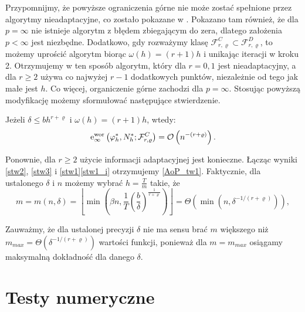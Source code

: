 \documentclass[oik, pdftex, robocza, man]{mgrwms}
\begin{document}
    Przypomnijmy, że powyższe ograniczenia górne nie może zostać spełnione przez algorytmy nieadaptacyjne, co zostało pokazane w \cite{PoA}. Pokazano tam również, że dla $p=\infty$ nie istnieje algorytm z błędem zbiegającym do zera, dlatego założenia $p < \infty$ jest niezbędne. Dodatkowo, gdy rozważymy klasę $\mathcal{F}_{r, \varrho}^{C} \subset \mathcal{F}_{r, \varrho}^{D}$, to możemy uprościć algorytm biorąc $\omega(h) = (r+1)h$ i unikając iteracji w kroku 2. Otrzymujemy w ten sposób algorytm, który dla $r=0,1$ jest nieadaptacyjny, a dla $r \geq 2$ używa co najwyżej $r-1$ dodatkowych punktów, niezależnie od tego jak małe jest $h$. Co więcej, organiczenie górne zachodzi dla $p = \infty$.
    Stosując powyższą modyfikację możemy sformułować następujące stwierdzenie.

    \begin{stw}
        \label{stw3}
        Jeżeli $\delta \leq bh^{r+\varrho}$ i $\omega(h) = (r+1)h$, wtedy:
        \begin{equation}
            \mathrm{e}_{\infty}^{\mathrm{\mathrm{wor}}}\left(\varphi_{h}^{*}, N_{h}^{*} ; \mathcal{F}_{r, \varrho}^{C}\right)=\mathcal{O}\left(n^{-(r+\varrho)}\right) .
        \end{equation}
    \end{stw}

    Ponownie, dla $r \geq 2$ użycie informacji adaptacyjnej jest konieczne. Łącząc wyniki \eqref{stw2}, \eqref{stw3} i \eqref{stw1}\eqref{stw1_i} otrzymujemy \eqref{AoP_tw1}.
    Faktycznie, dla ustalonego $\delta$ i $n$ możemy wybrać $h = \frac{T}{m}$ takie, że
    \begin{equation}
        m = m(n, \delta)=\left\lfloor\min \left(\beta n, \frac{1}{T}\left(\frac{b}{\delta}\right)^{\frac{1}{r+\varrho}}\right)\right\rfloor=\varTheta\left(\min \left(n, \delta^{-1 /(r+\varrho)}\right)\right),
    \end{equation}

    \begin{uw}
        Zauważmy, że dla ustalonej precyzji $\delta$ nie ma sensu brać $m$ większego niż $m_{max} = \varTheta(\delta^{-1 / (r+\varrho)})$ wartości funkcji, ponieważ dla $m = m_{max}$ osiągamy maksymalną dokładność dla danego $\delta$.
    \end{uw}

\mgrclosechapter


\chapter{Testy numeryczne}
\end{document}
